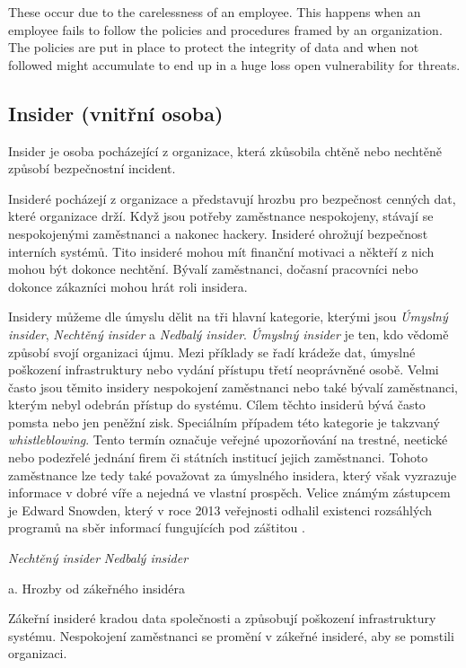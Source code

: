These occur due to the carelessness of an employee. This happens when an employee fails to follow the policies and procedures framed by an organization. The policies are put in place to protect the integrity of data and when not followed might accumulate to end up in a huge loss open vulnerability for threats.


\subsection{Insider (vnitřní osoba)}
Insider je osoba pocházející z organizace, která zkůsobila chtěně nebo nechtěně způsobí bezpečnostní incident.




Insideré pocházejí z organizace a představují hrozbu pro bezpečnost cenných dat, které organizace drží.
Když jsou potřeby zaměstnance nespokojeny, stávají se nespokojenými zaměstnanci a nakonec hackery.
Insideré ohrožují bezpečnost interních systémů.
Tito insideré mohou mít finanční motivaci a někteří z nich mohou být dokonce nechtění.
Bývalí zaměstnanci, dočasní pracovníci nebo dokonce zákazníci mohou hrát roli insidera.

Insidery můžeme dle úmyslu dělit na tři hlavní kategorie, kterými jsou \textit{Úmyslný insider}, \textit{Nechtěný insider} a \textit{Nedbalý insider}.
\textit{Úmyslný insider} je ten, kdo vědomě způsobí svojí organizaci újmu.
Mezi příklady se řadí krádeže dat, úmyslné poškození infrastruktury nebo vydání přístupu třetí neoprávněné osobě.
Velmi často jsou těmito insidery nespokojení zaměstnanci nebo také bývalí zaměstnanci, kterým nebyl odebrán přístup do systému.
Cílem těchto insiderů bývá často pomsta nebo jen peněžní zisk.
Speciálním případem této kategorie je takzvaný \textit{whistleblowing}.
Tento termín označuje veřejné upozorňování na trestné, neetické nebo podezřelé jednání firem či státních institucí jejich zaměstnanci.
Tohoto zaměstnance lze tedy také považovat za úmyslného insidera, který však vyzrazuje informace v dobré víře a nejedná ve vlastní prospěch.
Velice známým zástupcem je Edward Snowden, který v roce 2013 veřejnosti odhalil existenci rozsáhlých programů na sběr informací fungujících pod záštitou .

\textit{Nechtěný insider}
\textit{Nedbalý insider}



a. Hrozby od zákeřného insidéra

Zákeřní insideré kradou data společnosti a způsobují poškození infrastruktury systému.
Nespokojení zaměstnanci se promění v zákeřné insideré, aby se pomstili organizaci.

